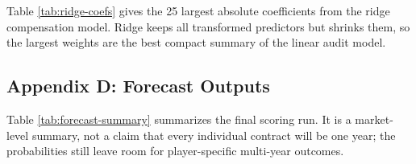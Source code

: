 \documentclass[
  10pt,
]{article}
\begin{document}
Table \ref{tab:ridge-coefs} gives the 25 largest absolute coefficients from the ridge compensation model. Ridge keeps all transformed predictors but shrinks them, so the largest weights are the best compact summary of the linear audit model.

\subsection{Appendix D: Forecast Outputs}\label{appendix-d-forecast-outputs}

\begin{table}[H]
\centering
\caption{\label{tab:forecast-summary-table}\label{tab:forecast-summary} Market-level summary of unsigned 2026 WR projections from the predictive pair.}
\centering
{}
\end{table}

Table \ref{tab:forecast-summary} summarizes the final scoring run. It is a market-level summary, not a claim that every individual contract will be one year; the probabilities still leave room for player-specific multi-year outcomes.
\end{document}

